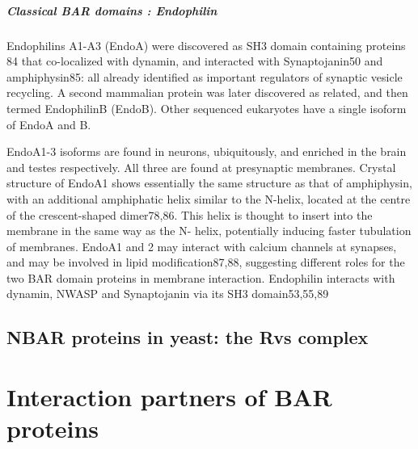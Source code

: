 		\subparagraph{Classical BAR domains : Endophilin}
		Endophilins A1-A3 (EndoA) were discovered as SH3 domain containing proteins 84 that co-localized with dynamin, and interacted with Synaptojanin50 and amphiphysin85: all already identified as important regulators of synaptic vesicle recycling. A second mammalian protein was later discovered as related, and then termed EndophilinB (EndoB). Other sequenced eukaryotes have a single isoform of EndoA and B.

		\vspace{5mm}
		EndoA1-3 isoforms are found in neurons, ubiquitously, and enriched in the brain and testes respectively. All three are found at presynaptic membranes. Crystal structure of EndoA1 shows essentially the same structure as that of amphiphysin, with an additional amphiphatic helix similar to the N-helix, located at the centre of the crescent-shaped dimer78,86. This helix is thought to insert into the membrane in the same way as the N- helix, potentially inducing faster tubulation of membranes. EndoA1 and 2 may interact with calcium channels at synapses, and may be involved in lipid modification87,88, suggesting different roles for the two BAR domain proteins in membrane interaction. Endophilin interacts with dynamin, NWASP and Synaptojanin via its SH3 domain53,55,89


	\subsection{NBAR proteins in yeast: the Rvs complex}		
		
		
	\section{Interaction partners of BAR proteins}
